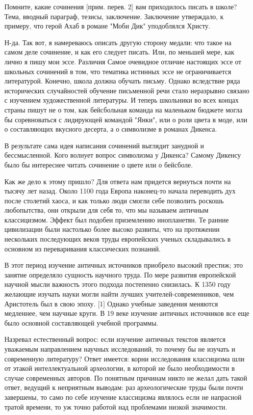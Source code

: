 \documentclass[ebook,12pt,oneside,openany]{memoir}
\begin{document}
\maketitle

Помните, какие сочинения [прим. перев. 2] вам приходилось писать в
школе? Тема, вводный параграф, тезисы, заключение. Заключение
утверждало, к примеру, что герой Ахаб в романе "Моби Дик" уподоблялся
Христу.

Н-да. Так вот, я намереваюсь описать другую сторону медали: что такое
на самом деле сочинение, и как его следует писать. Или, по меньшей
мере, как лично я пишу мои эссе. Различия Самое очевидное отличие
настоящих эссе от школьных сочинений в том, что тематика истинных эссе
не ограничивается литературой. Конечно, школа должна обучать письму.
Однако вследствие ряда исторических случайностей обучение письменной
речи стало неразрывно связано с изучением художественной литературы. И
теперь школьники во всех концах страны пишут не о том, как бейсбольная
команда на маленьком бюджете могла бы соревноваться с лидирующей
командой "Янки", или о роли цвета в моде, или о составляющих вкусного
десерта, а о символизме в романах Дикенса.

В результате сама идея написания сочинений выглядит занудной и
бессмысленной. Кого волнует вопрос символизма у Дикенса? Самому
Дикенсу было бы интереснее читать сочинение о цвете или о бейсболе.

Как же дело к этому пришло? Для ответа нам придется вернуться почти на
тысячу лет назад. Около 1100 года Европа наконец-то начала переводить
дух после столетий хаоса, и как только люди смогли себе позволить
роскошь любопытства, они открыли для себя то, что мы называем античным
классицизмом. Эффект был подобен приземлению инопланетян. Те ранние
цивилизации были настолько более высоко развиты, что на протяжении
нескольких последующих веков труды европейских ученых складывались в
основном из переваривания классических познаний.

В этот период изучение античных источников приобрело высокий престиж;
это занятие определяло сущность научного труда. По мере развития
европейской научной мысли важность этого подхода постепенно снизилась.
К 1350 году желающие изучать науки могли найти лучших
учителей-современников, чем Аристотель был в свою эпоху. [1] Однако
учебные заведения меняются медленнее, чем научные круги. В 19 веке
изучение античных источников все еще было основной составляющей
учебной программы.

Назревал естественный вопрос: если изучение античных текстов является
уважаемым направлением научных исследований, то почему бы не изучать и
современную литературу? Ответ имеется: корни исследования классицизма
шли от этакой интеллектуальной археологии, в которой не было
необходимости в случае современных авторов. По понятным причинам никто
не желал дать такой ответ, ведущий к неприятным выводам: раз
археологические труды были почти завершены, то само по себе изучение
классицизма являлось если не напрасной тратой времени, то уж точно
работой над проблемами низкой значимости.
\end{document}
